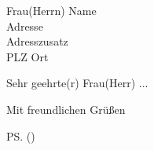 \documentclass[
	ngerman,
	fontsize=11pt,
	paper=a4,
	enlargefirstpage=on,
	pagenumber=headright,
	headsepline=on,
	parskip=half,
	fromphone=on,
	fromemail=true,
	fromalign=right, %
	foldmarks=true,
	draft=false
]{scrlttr2}
\begin{document}
\makeatletter 


\begin{letter}{Frau(Herrn) Name\\Adresse\\Adresszusatz\\PLZ Ort}

\opening{Sehr geehrte(r) Frau(Herr) ...}

\Blindtext

\closing{Mit freundlichen Grüßen}
\ps(\blindtext)

\end{letter}
\end{document}
